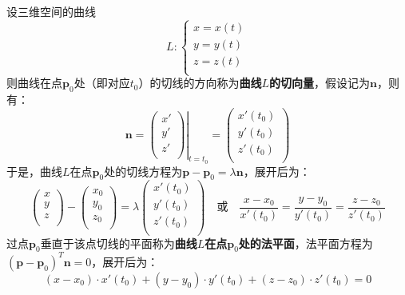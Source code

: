 \begin{definition}
设三维空间的曲线
\[
L:\left\{ \begin{array}{c}
	x=x\left( t \right)\\
	y=y\left( t \right)\\
	z=z\left( t \right)\\
\end{array} \right.
\]
则曲线在点$\boldsymbol{p}_0$处（即对应$t_0$）的切线的方向称为{\bf 曲线$L$的切向量}，假设记为$\boldsymbol{n}$，则有：
\[
\boldsymbol{n}=\left. \left( \begin{array}{c}
	x'\\
	y'\\
	z'\\
\end{array} \right) \right|_{t=t_0}=\left( \begin{array}{c}
	x'\left( t_0 \right)\\
	y'\left( t_0 \right)\\
	z'\left( t_0 \right)\\
\end{array} \right)
\]
于是，曲线$L$在点$\boldsymbol{p}_0$处的切线方程为$\boldsymbol{p}-\boldsymbol{p}_0=\lambda \boldsymbol{n}$，展开后为：
\[
\left( \begin{array}{c}
	x\\
	y\\
	z\\
\end{array} \right) -\left( \begin{array}{c}
	x_0\\
	y_0\\
	z_0\\
\end{array} \right) =\lambda \left( \begin{array}{c}
	x'\left( t_0 \right)\\
	y'\left( t_0 \right)\\
	z'\left( t_0 \right)\\
\end{array} \right) \quad \text{或} \quad \frac{x-x_0}{x'\left( t_0 \right)}=\frac{y-y_0}{y'\left( t_0 \right)}=\frac{z-z_0}{z'\left( t_0 \right)}
\]
过点$\boldsymbol{p}_0$垂直于该点切线的平面称为{\bf 曲线$L$在点$\boldsymbol{p}_0$处的法平面}，法平面方程为$\left( \boldsymbol{p}-\boldsymbol{p}_0 \right) ^T\boldsymbol{n}=0$，展开后为：
\[
\left( x-x_0 \right) \cdot x'\left( t_0 \right) +\left( y-y_0 \right) \cdot y'\left( t_0 \right) +\left( z-z_0 \right) \cdot z'\left( t_0 \right) =0
\]
\end{definition}

